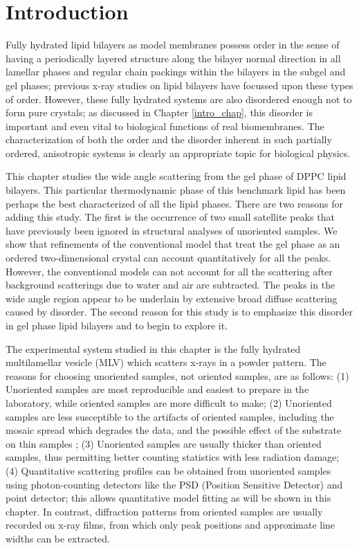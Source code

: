 \section{Introduction}
\label{gel_model_intro}

Fully hydrated lipid bilayers as model membranes possess order 
in the sense of having a periodically layered structure along the bilayer 
normal direction in all lamellar phases and regular chain packings within 
the bilayers in the subgel and gel phases; previous x-ray studies on 
lipid bilayers have focussed upon these types of order. However, these fully 
hydrated systems are also disordered enough not to form pure crystals; 
as discussed in Chapter \ref{intro_chap}, this disorder is important and 
even vital to biological functions of real biomembranes. The 
characterization of both the order and the disorder inherent in such 
partially ordered, anisotropic systems is clearly an appropriate topic 
for biological physics.

This chapter studies the wide angle scattering from the gel phase of 
DPPC lipid bilayers. This particular thermodynamic phase of this benchmark 
lipid has been perhaps the best characterized of all the lipid phases.  
There are two reasons for adding this study.
The first is the occurrence of two small satellite peaks that have previously 
been ignored in structural analyses of unoriented samples.  We show that
refinements of the conventional model that treat the gel phase
as an ordered two-dimensional crystal can account quantitatively for all 
the peaks.  However, the conventional models can not account for all 
the scattering after background scatterings due to water and air are 
subtracted.  The peaks in the wide angle region appear to be underlain 
by extensive broad diffuse scattering caused by disorder.  
The second reason for this study is to emphasize this disorder in 
gel phase lipid bilayers and to begin to explore it.

The experimental system studied in this chapter is the fully hydrated
multilamellar vesicle (MLV) which scatters x-rays in a powder pattern.
The reasons for choosing unoriented samples, not oriented
samples, are as follows: (1) Unoriented samples are most reproducible and 
easiest to prepare in the laboratory, while oriented samples are more 
difficult to make; (2) Unoriented samples are less susceptible to
the artifacts of oriented samples, including the mosaic spread which
degrades the data, and the possible effect of the substrate on
thin samples \cite{STN92,Wac89a}; (3) Unoriented samples are usually
thicker than oriented samples, thus permitting better counting statistics 
with less radiation damage; (4) Quantitative scattering profiles can
be obtained from unoriented samples using photon-counting detectors
like the PSD (Position Sensitive Detector) and point detector; this allows
quantitative model fitting as will be shown in this chapter. In contrast,
diffraction patterns from oriented samples are usually recorded on
x-ray films, from which only peak positions and approximate line widths
can be extracted.

